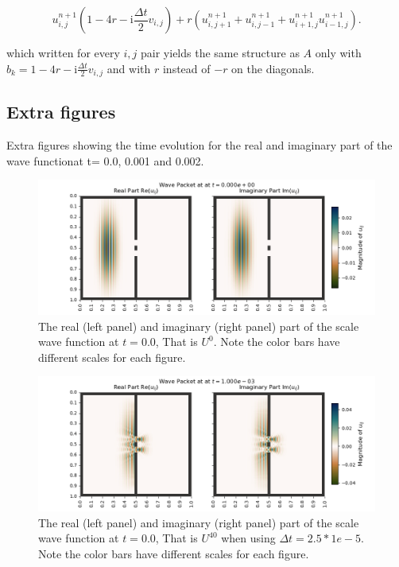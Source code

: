 \documentclass[../main_proj5.tex]{subfiles}
\begin{document}
\begin{equation*}
    u_{i,j}^{n+1}(1 - 4r - \text{i} \frac{\Delta t}{2} v_{i,j}) 
    + r(u_{i,j+1}^{n+1} +u_{i,j-1}^{n+1} + u_{i+1,j}^{n+1} u_{i-1,j}^{n+1}) .
\end{equation*}

\noindent which written for every $i,j$ pair yields the same structure as $A$ only with $b_k = 1 -4r - \text{i} \frac{\Delta t}{2} v_{i,j}$ and with $r$ instead of $-r$ on the diagonals. 

\newpage
\subsection{Extra figures}\label{app:p5_AppendixA_Extra_figures}

Extra figures showing the time evolution for the real and imaginary part of the wave functionat  t= 0.0, 0.001 and 0.002.

\begin{figure}[h!]
    \centering
    \includegraphics[width=0.75\linewidth]{Project 5/figures/problem8and9_M201_Nslits2_uij_000.png}
    \caption{The real (left panel) and imaginary (right panel) part of the scale wave function at $t=0.0$, That is $U^{0}$. Note the color bars have different scales for each figure.}
    \label{fig:enter-label}
\end{figure}

\begin{figure}[h!]
    \centering
    \includegraphics[width=0.75\linewidth]{Project 5/figures/problem8and9_M201_Nslits2_uij_040.png}
    \caption{The real (left panel) and imaginary (right panel) part of the scale wave function at $t=0.0$, That is $U^{40}$ when using $\Delta t = 2.5*1e-5$. Note the color bars have different scales for each figure.}
    \label{fig:enter-label}
\end{figure}
\end{document}
